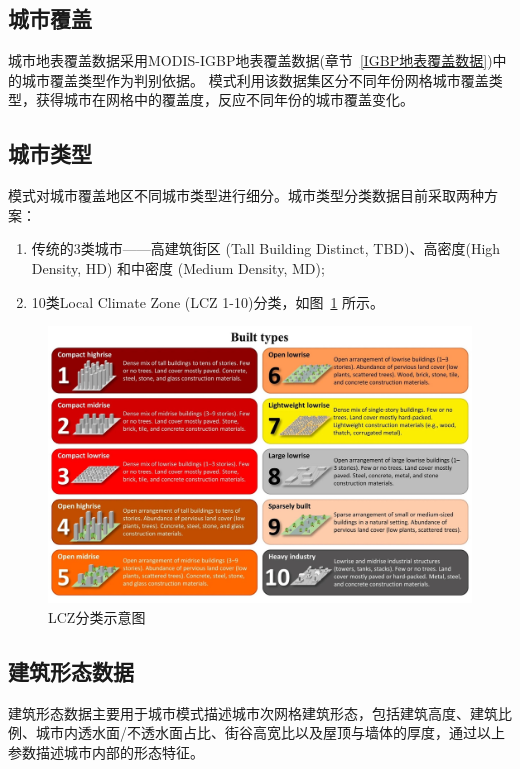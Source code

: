 \subsection{城市覆盖}\label{城市覆盖}
城市地表覆盖数据采用MODIS-IGBP地表覆盖数据(章节~\ref{IGBP地表覆盖数据})中的城市覆盖类型作为判别依据。
模式利用该数据集区分不同年份网格城市覆盖类型，获得城市在网格中的覆盖度，反应不同年份的城市覆盖变化。


\subsection{城市类型}\label{城市类型}
模式对城市覆盖地区不同城市类型进行细分。城市类型分类数据目前采取两种方案：
\begin{enumerate}
  \item 传统的3类城市——高建筑街区 (Tall Building Distinct, TBD)、高密度(High Density, HD) 和中密度 (Medium Density, MD);
  \item 10类Local Climate Zone (LCZ 1-10)分类，如图~\ref{fig:LCZ分类图示}  所示。
\end{enumerate}

{
  \begin{figure}[htbp]
    \centering
    \includegraphics[width=\textwidth]{Figures/基础数据/LCZ分类图示.jpg}
    \caption{LCZ分类示意图~\citep{demuzere2020combining,stewart2012local}}
    \label{fig:LCZ分类图示}
  \end{figure}
}


\subsection{建筑形态数据}\label{建筑形态数据}
建筑形态数据主要用于城市模式描述城市次网格建筑形态，包括建筑高度、建筑比例、城市内透水面/不透水面占比、街谷高宽比以及屋顶与墙体的厚度，通过以上参数描述城市内部的形态特征。

